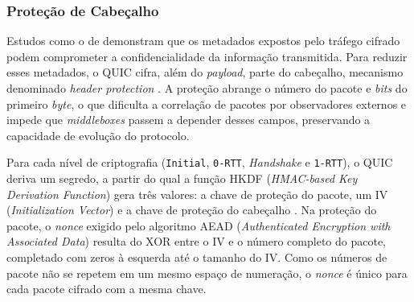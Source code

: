 \subsubsection{Proteção de Cabeçalho}
\label{sec:quic_header_protection}

Estudos como o de \citep{reed2017identifying} demonstram que os metadados expostos pelo tráfego cifrado podem comprometer a confidencialidade da informação transmitida. Para reduzir esses metadados, o QUIC cifra, além do \textit{payload}, parte do cabeçalho, mecanismo denominado \textit{header protection} \citep{rfc9001}. A proteção abrange o número do pacote e \textit{bits} do primeiro \textit{byte}, o que dificulta a correlação de pacotes por observadores externos e impede que \textit{middleboxes} passem a depender desses campos, preservando a capacidade de evolução do protocolo.

Para cada nível de criptografia (\texttt{Initial}, \texttt{0-RTT}, \textit{Handshake} e \texttt{1-RTT}), o QUIC deriva um segredo, a partir do qual a função HKDF (\textit{HMAC-based Key Derivation Function}) gera três valores: a chave de proteção do pacote, um IV (\textit{Initialization Vector}) e a chave de proteção do cabeçalho \citep{rfc9001}. Na proteção do pacote, o \textit{nonce} exigido pelo algoritmo AEAD (\textit{Authenticated Encryption with Associated Data}) resulta do XOR entre o IV e o número completo do pacote, completado com zeros à esquerda até o tamanho do IV. Como os números de pacote não se repetem em um mesmo espaço de numeração, o \textit{nonce} é único para cada pacote cifrado com a mesma chave.

